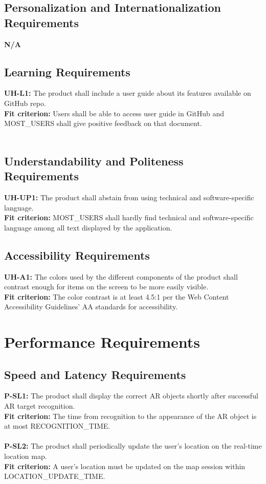 \documentclass[12pt]{article}
\begin{document}
\subsection{Personalization and Internationalization Requirements}
  \textbf{N/A}\\
\subsection{Learning Requirements}
  \textbf{UH-L1:} The product shall include a user guide about its features available on GitHub repo.\\
  \textbf{Fit criterion:} Users shall be able to access user guide in GitHub and MOST\_USERS shall give positive feedback on that document.\\\\
\subsection{Understandability and Politeness Requirements}
  \textbf{UH-UP1:} The product shall abstain from using technical and software-specific language.\\
  \textbf{Fit criterion:} MOST\_USERS shall hardly find technical and software-specific language among all text displayed by the application.\\
\subsection{Accessibility Requirements}
  \textbf{UH-A1:} The colors used by the different components of the product shall contrast enough for items on the screen to be more easily visible.\\
  \textbf{Fit criterion:} The color contrast is at least 4.5:1 per the Web Content Accessibility Guidelines’ AA standards for accessibility\cite{WCAG}.\\

\section{Performance Requirements}
\subsection{Speed and Latency Requirements}
  \textbf{P-SL1:} The product shall display the correct AR objects shortly after successful AR target recognition.\\
  \textbf{Fit criterion:} The time from recognition to the appearance of the AR object is at most RECOGNITION\_TIME.\\\\
  \textbf{P-SL2:} The product shall periodically update the user’s location on the real-time location map.\\
  \textbf{Fit criterion:} A user’s location must be updated on the map session within LOCATION\_UPDATE\_TIME.\\
\end{document}
